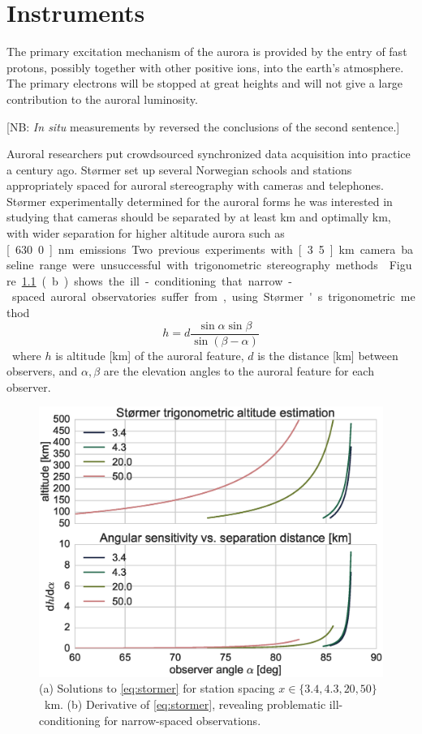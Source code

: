 \chapter{Instruments}
\label{chapter:inst}
\thispagestyle{myheadings}

\graphicspath{{Instruments/}}

\epigraph{The primary excitation mechanism of the aurora is provided by the entry of fast protons, possibly together with other positive ions, into the earth’s atmosphere. The primary electrons will be stopped at great heights and will not give a large contribution to the auroral luminosity.}{[NB: \textit{In situ} measurements by \citet{mcilwain1960} reversed the conclusions of the second sentence.] \citep{seaton1954}}

Auroral researchers put crowdsourced synchronized data acquisition into practice a century ago. 
Størmer set up several Norwegian schools and stations appropriately spaced for auroral stereography with cameras and telephones.
Størmer experimentally determined for the auroral forms he was interested in studying that cameras should be separated by at least \unit[20]{km} and optimally \unit[50]{km}, with wider separation for higher altitude aurora \citep{egeland2013} such as \unit[630.0]{nm} emissions.
Two previous experiments with \unit[3..5]{km} camera baseline range were unsuccessful with trigonometric stereography methods \citep{egeland2013}.
Figure~\ref{fig:stormersens}(b) shows the ill-conditioning that narrow-spaced auroral observatories suffer from, using Størmer's trigonometric method \citep{egeland2013}
\begin{equation}\label{eq:stormer}
h = d \frac{\sin\alpha \sin\beta}{\sin(\beta-\alpha)}
\end{equation}
where $h$ is altitude [km] of the auroral feature, $d$ is the distance [km] between observers, and $\alpha,\beta$ are the elevation angles to the auroral feature for each observer.
\begin{figure}\centering
	\includegraphics[width=\linewidth]{gfx/stormer_sens}
	\caption{(a) Solutions to \eqref{eq:stormer} for station spacing $x \in \lbrace 3.4, 4.3, 20,50 \rbrace$~km.
		(b) Derivative of \eqref{eq:stormer}, revealing problematic ill-conditioning for narrow-spaced observations.}
	\label{fig:stormersens}
\end{figure}
